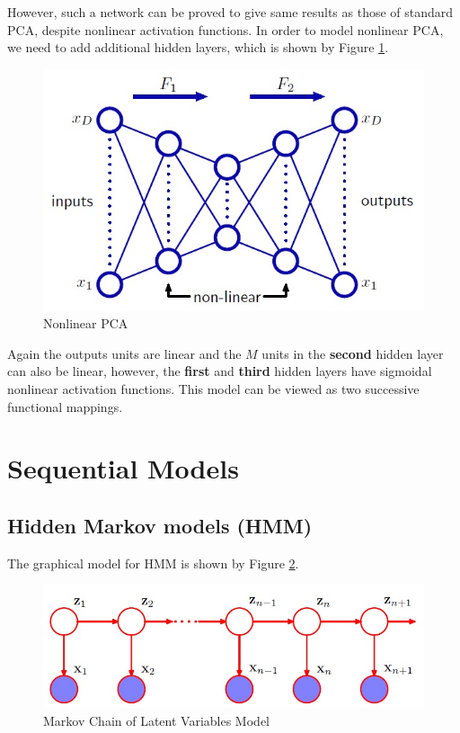 \documentclass[a4paper]{report}
\begin{document}
However, such a network can be proved to give same results as those of standard PCA, despite nonlinear activation functions. In order to model nonlinear PCA, we need to add additional hidden layers, which is shown by Figure \ref{ANN2}.
\begin{figure}
	\centering
	\includegraphics[scale = .4]{ANN2}
	\caption{Nonlinear PCA} \label{ANN2}
\end{figure}
Again the outputs units are linear and the $M$ units in the \textbf{second} hidden layer can also be linear, however, the \textbf{first} and \textbf{third} hidden layers have sigmoidal nonlinear activation functions. This model can be viewed as two successive functional mappings.
\section{Sequential Models}
\subsection{Hidden Markov models (HMM)}
The graphical model for HMM is shown by Figure \ref{HMM}.
\begin{figure}
	\centering
	\includegraphics[scale=.5]{HMM}
	\caption{Markov Chain of Latent Variables Model}\label{HMM}
\end{figure}
\end{document}
